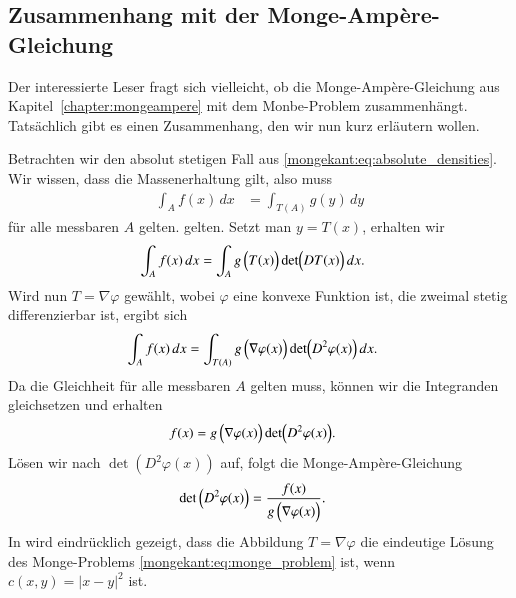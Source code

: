 \subsection{Zusammenhang mit der Monge-Ampère-Gleichung}
Der interessierte Leser fragt sich vielleicht,
ob die Monge-Ampère-Gleichung aus Kapitel~\ref{chapter:mongeampere}
mit dem Monbe-Problem zusammenhängt.
Tatsächlich gibt es einen Zusammenhang,
den wir nun kurz erläutern wollen.

Betrachten wir den absolut stetigen Fall aus \eqref{mongekant:eq:absolute_densities}.
Wir wissen,
dass die Massenerhaltung gilt,
also muss
\begin{align*}
\int_{A} f(x) \, dx
&=
\int_{T(A)} g(y) \, dy
\end{align*}
für alle messbaren $A$ gelten.
gelten.
Setzt man $y = T(x)$,
erhalten wir
\begin{align*}
\int_{A} f(x) \, dx
&=
\int_{A} g\,\Bigl(T(x)\Bigr) \det\Bigl(DT(x)\Bigr) \, dx
.
\end{align*}
Wird nun $T = \nabla \varphi$ gewählt,
wobei $\varphi$ eine konvexe Funktion ist,
die zweimal stetig differenzierbar ist,
ergibt sich
\begin{align*}
\int_{A} f(x) \, dx
&=
\int_{T(A)} g\,\Bigl(\nabla \varphi(x)\Bigr) \det\Bigl(D^2 \varphi(x)\Bigr) \, dx
.
\end{align*}
Da die Gleichheit für alle messbaren $A$ gelten muss,
können wir die Integranden gleichsetzen und erhalten
\begin{align*}
f(x)
&=
g\,\Bigl(\nabla \varphi(x)\Bigr) \det\Bigl(D^2 \varphi(x)\Bigr)
.
\end{align*}
Lösen wir nach $\det(D^2 \varphi(x))$ auf,
folgt die Monge-Ampère-Gleichung
\begin{align*}
\det\,\Bigl(D^2 \varphi(x)\Bigr)
&=
\frac{f(x)}{g\,\Bigl(\nabla \varphi(x)\Bigr)}
.
\end{align*}
In \cite{mongekant:brenier} wird eindrücklich gezeigt,
dass die Abbildung $T = \nabla \varphi$
die eindeutige Lösung des Monge-Problems \eqref{mongekant:eq:monge_problem} ist,
wenn $c(x,y) = \left\lvert x - y\right\rvert^2$ ist.

